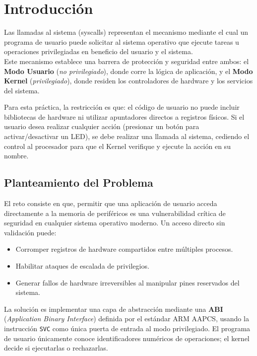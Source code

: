 \documentclass[12pt,letterpaper]{article}
\begin{document}


\newpage

\section*{Introducción}
Las llamadas al sistema (syscalls) representan el mecanismo mediante el cual un programa de usuario puede solicitar al sistema operativo que ejecute tareas u operaciones privilegiadas en beneficio del usuario y el sistema.\\

\noindent
Este mecanismo establece una barrera de protección y seguridad entre ambos: el \textbf{Modo Usuario} (\textit{no privilegiado}), donde corre la lógica de aplicación, y el \textbf{Modo Kernel} (\textit{privilegiado}), donde residen los controladores de hardware y los servicios del sistema.

\noindent
Para esta práctica, la restricción es que: el código de usuario no puede incluir bibliotecas de hardware ni utilizar apuntadores directos a registros físicos. Si el usuario desea realizar cualquier acción (presionar un botón para activar/desactivar un LED), se debe realizar una llamada al sistema, cediendo el control al procesador para que el Kernel verifique y ejecute la acción en su nombre.

\subsection*{Planteamiento del Problema}

El reto consiste en que, permitir que una aplicación de usuario acceda directamente a la memoria de periféricos es una vulnerabilidad crítica de seguridad en cualquier sistema operativo moderno. Un acceso directo sin validación puede:
\begin{itemize}
\item Corromper registros de hardware compartidos entre múltiples procesos.
\item Habilitar ataques de escalada de privilegios.
\item Generar fallos de hardware irreversibles al manipular pines reservados del sistema.
\end{itemize}
 
La solución es implementar una capa de abstracción mediante una \textbf{ABI} (\textit{Application Binary Interface}) definida por el estándar ARM AAPCS, usando la instrucción \texttt{SVC} como única puerta de entrada al modo privilegiado. El programa de usuario únicamente conoce identificadores numéricos de operaciones; el kernel decide si ejecutarlas o rechazarlas.
\end{document}
